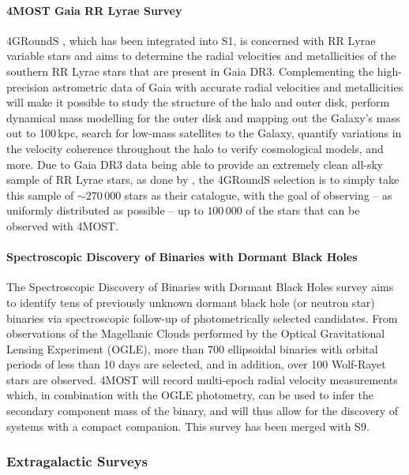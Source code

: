 \documentclass[a4paper,11pt]{article}
\begin{document}
\paragraph{4MOST Gaia RR Lyrae Survey}
4GRoundS \citep{4grounds}, which has been integrated into S1, is concerned with RR Lyrae variable stars and aims to determine the radial velocities and metallicities of the southern RR Lyrae stars that are present in Gaia DR3. Complementing the high-precision astrometric data of Gaia with accurate radial velocities and metallicities will make it possible to study the structure of the halo and outer disk, perform dynamical mass modelling for the outer disk and mapping out the Galaxy's mass out to 100\,kpc, search for low-mass satellites to the Galaxy, quantify variations in the velocity coherence throughout the halo to verify cosmological models, and more. Due to Gaia DR3 data being able to provide an extremely clean all-sky sample of RR Lyrae stars, as done by \citet{clementini23}, the 4GRoundS selection is to simply take this sample of ${\sim}270\,000$ stars as their catalogue, with the goal of observing -- as uniformly distributed as possible -- up to $100\,000$ of the stars that can be observed with 4MOST.
%
\paragraph{Spectroscopic Discovery of Binaries with Dormant Black Holes}
The Spectroscopic Discovery of Binaries with Dormant Black Holes survey \citep{pawlak23} aims to identify tens of previously unknown dormant black hole (or neutron star) binaries via spectroscopic follow-up of photometrically selected candidates. From observations of the Magellanic Clouds performed by the Optical Gravitational Lensing Experiment (OGLE), more than 700 ellipsoidal binaries with orbital periods of less than 10 days are selected, and in addition, over 100 Wolf-Rayet stars are observed. 4MOST will record multi-epoch radial velocity measurements which, in combination with the OGLE photometry, can be used to infer the secondary component mass of the binary, and will thus allow for the discovery of systems with a compact companion. This survey has been merged with S9.
%
\subsubsection{Extragalactic Surveys}
\end{document}
